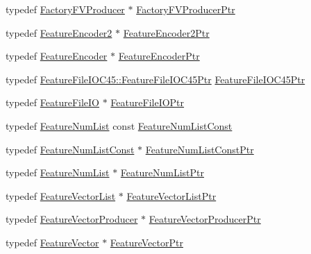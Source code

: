 \begin{DoxyCompactItemize}
\item 
typedef \hyperlink{class_k_k_m_l_l_1_1_factory_f_v_producer}{Factory\+F\+V\+Producer} $\ast$ \hyperlink{namespace_k_k_m_l_l_a82812d1feb85a6cff72d059bc67bb90e}{Factory\+F\+V\+Producer\+Ptr}
\item 
typedef \hyperlink{class_k_k_m_l_l_1_1_feature_encoder2}{Feature\+Encoder2} $\ast$ \hyperlink{namespace_k_k_m_l_l_a1f6189100c36e1d399f2155020fcfc8a}{Feature\+Encoder2\+Ptr}
\item 
typedef \hyperlink{class_k_k_m_l_l_1_1_feature_encoder}{Feature\+Encoder} $\ast$ \hyperlink{namespace_k_k_m_l_l_a72cdf9beec1c671ef814e86c1df34874}{Feature\+Encoder\+Ptr}
\item 
typedef \hyperlink{class_k_k_m_l_l_1_1_feature_file_i_o_c45_ae0cc1ea15fc10f1a030fcbbf10a08af8}{Feature\+File\+I\+O\+C45\+::\+Feature\+File\+I\+O\+C45\+Ptr} \hyperlink{namespace_k_k_m_l_l_ab57854d582cae8723e029d8066ef75b8}{Feature\+File\+I\+O\+C45\+Ptr}
\item 
typedef \hyperlink{class_k_k_m_l_l_1_1_feature_file_i_o}{Feature\+File\+IO} $\ast$ \hyperlink{namespace_k_k_m_l_l_aa005d92db87866fad489feb5ff4b2dfa}{Feature\+File\+I\+O\+Ptr}
\item 
typedef \hyperlink{class_k_k_m_l_l_1_1_feature_num_list}{Feature\+Num\+List} const \hyperlink{namespace_k_k_m_l_l_ad276a9ed309552a63300bce930bdfebd}{Feature\+Num\+List\+Const}
\item 
typedef \hyperlink{namespace_k_k_m_l_l_ad276a9ed309552a63300bce930bdfebd}{Feature\+Num\+List\+Const} $\ast$ \hyperlink{namespace_k_k_m_l_l_a81284b0a14973267260023f9a72da94a}{Feature\+Num\+List\+Const\+Ptr}
\item 
typedef \hyperlink{class_k_k_m_l_l_1_1_feature_num_list}{Feature\+Num\+List} $\ast$ \hyperlink{namespace_k_k_m_l_l_a66661b68121fdcc4154fb73813696dcc}{Feature\+Num\+List\+Ptr}
\item 
typedef \hyperlink{class_k_k_m_l_l_1_1_feature_vector_list}{Feature\+Vector\+List} $\ast$ \hyperlink{namespace_k_k_m_l_l_acf2ba92a3cf03e2b19674b24ff488ef6}{Feature\+Vector\+List\+Ptr}
\item 
typedef \hyperlink{class_k_k_m_l_l_1_1_feature_vector_producer}{Feature\+Vector\+Producer} $\ast$ \hyperlink{namespace_k_k_m_l_l_a5fcda00f9ffbd9fb40e02f013be900e3}{Feature\+Vector\+Producer\+Ptr}
\item 
typedef \hyperlink{class_k_k_m_l_l_1_1_feature_vector}{Feature\+Vector} $\ast$ \hyperlink{namespace_k_k_m_l_l_a0c5df3d48f45926fbc4fee04f5e3bc04}{Feature\+Vector\+Ptr}
\item 

\end{DoxyCompactItemize}
